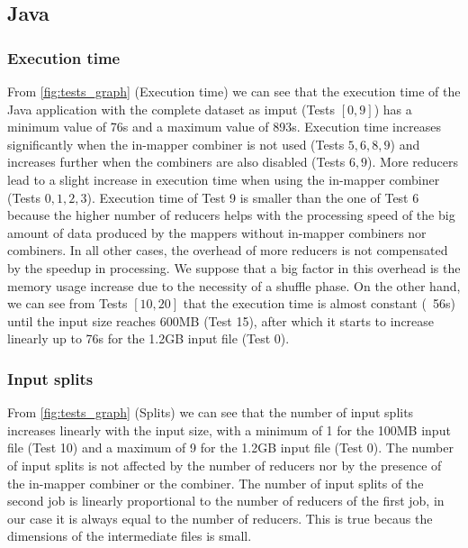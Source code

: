 \documentclass{article}
\begin{document}
\begin{multicols}{2}
    \subsection{Java}
        \subsubsection{Execution time}
            From \autoref{fig:tests_graph} (Execution time) we can see that the execution time of the
            Java application with the complete dataset as imput (Tests $[0,9]$) has a minimum value of 76s and
            a maximum value of 893s.
            Execution time increases significantly when the in-mapper combiner is not used (Tests ${5,6,8,9}$)
            and increases further when the combiners are also disabled (Tests ${6,9}$).
            More reducers lead to a slight increase in execution time when using the in-mapper combiner 
            (Tests ${0,1,2,3}$). Execution time of Test 9 is smaller than the one of Test 6 because the
            higher number of reducers helps with the processing speed of the big amount of data produced 
            by the mappers without in-mapper combiners nor combiners.
            In all other cases, the overhead of more reducers is not compensated by the speedup in processing.
            We suppose that a big factor in this overhead is the memory usage increase due to the necessity of
            a shuffle phase.
            On the other hand, we can see from Tests $[10,20]$ that the execution time is almost constant
            (~56s) until the input size reaches 600MB (Test 15), after which it starts to increase linearly
            up to 76s for the 1.2GB input file (Test 0).
        \subsubsection{Input splits}
            From \autoref{fig:tests_graph} (Splits) we can see that the number of input splits 
            increases linearly with the input size, with a minimum of 1 for the 100MB input file (Test 10) 
            and a maximum of 9 for the 1.2GB input file (Test 0).
            The number of input splits is not affected by the number of reducers nor by the presence of 
            the in-mapper combiner or the combiner.
            The number of input splits of the second job is linearly proportional to the number of reducers
            of the first job, in our case it is always equal to the number of reducers. This is true
            becaus the dimensions of the intermediate files is small.

\end{multicols}
\end{document}
